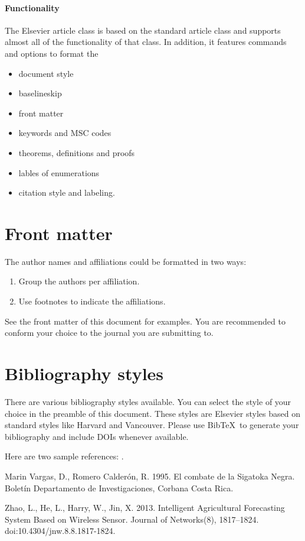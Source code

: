 \documentclass[review]{elsarticle}
\begin{document}
\paragraph{Functionality} The Elsevier article class is based on the standard article class and supports almost all of the functionality of that class. In addition, it features commands and options to format the
\begin{itemize}
\item document style
\item baselineskip
\item front matter
\item keywords and MSC codes
\item theorems, definitions and proofs
\item lables of enumerations
\item citation style and labeling.
\end{itemize}

\section{Front matter}

The author names and affiliations could be formatted in two ways:
\begin{enumerate}[(1)]
\item Group the authors per affiliation.
\item Use footnotes to indicate the affiliations.
\end{enumerate}
See the front matter of this document for examples. You are recommended to conform your choice to the journal you are submitting to.

\section{Bibliography styles}

There are various bibliography styles available. You can select the style of your choice in the preamble of this document. These styles are Elsevier styles based on standard styles like Harvard and Vancouver. Please use Bib\TeX\ to generate your bibliography and include DOIs whenever available.

Here are two sample references: \citep{Zhao2013}.

\begin{thebibliography}{1}



 Marin Vargas, D., Romero Calderón, R. 1995. El combate de la Sigatoka Negra. Boletín Departamento de Investigaciones, Corbana Costa Rica.

Zhao, L., He, L., Harry, W., Jin, X. 2013. Intelligent Agricultural Forecasting System Based on Wireless Sensor. Journal of Networks(8), 1817–1824. doi:10.4304/jnw.8.8.1817-1824.


\end{thebibliography}
\end{document}
